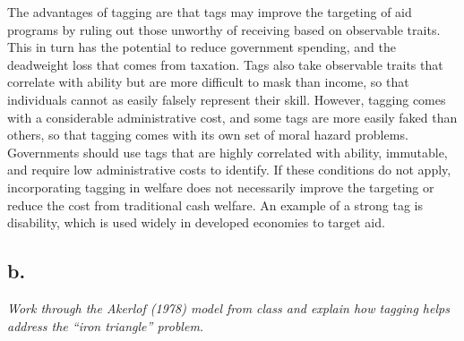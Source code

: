\documentclass[
]{article}
\begin{document}
The advantages of tagging are that tags may improve the targeting of aid
programs by ruling out those unworthy of receiving based on observable
traits. This in turn has the potential to reduce government spending,
and the deadweight loss that comes from taxation. Tags also take
observable traits that correlate with ability but are more difficult to
mask than income, so that individuals cannot as easily falsely represent
their skill. However, tagging comes with a considerable administrative
cost, and some tags are more easily faked than others, so that tagging
comes with its own set of moral hazard problems.\\
Governments should use tags that are highly correlated with ability,
immutable, and require low administrative costs to identify. If these
conditions do not apply, incorporating tagging in welfare does not
necessarily improve the targeting or reduce the cost from traditional
cash welfare. An example of a strong tag is disability, which is used
widely in developed economies to target aid.

\hypertarget{b.-2}{%
\subsection{b.}\label{b.-2}}

\textit{Work through the Akerlof (1978) model from class and explain how tagging helps address the “iron triangle” problem.}
\end{document}
